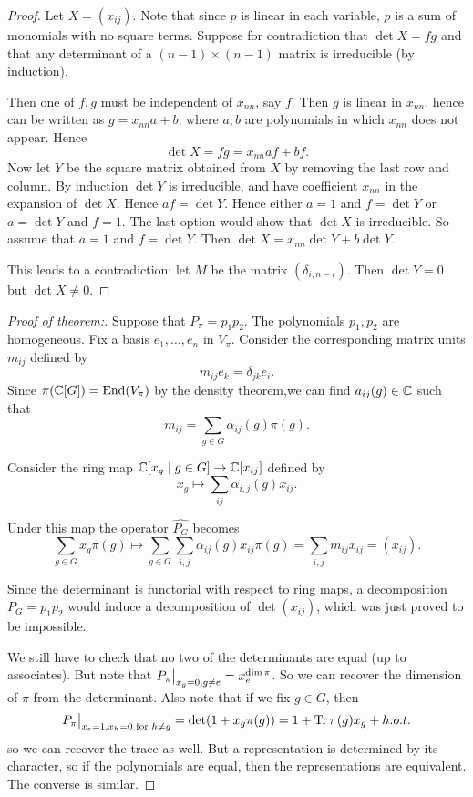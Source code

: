 \documentclass[11pt, english]{article}
\begin{document}
\begin{proof}
Let $X=(x_{ij})$. Note that since $p$ is linear in each variable, $p$ is a sum of monomials with no square terms. Suppose for contradiction that $\det X = fg$ and that any determinant of a $(n-1) \times (n-1)$ matrix is irreducible (by induction).

Then one of $f,g$ must be independent of $x_{nn}$, say $f$. Then $g$ is linear in $x_{nn}$, hence can be written as $g=x_{nn}a+b$, where $a,b$ are polynomials in which $x_{nn}$ does not appear. Hence
$$
\det X = fg = x_{nn}af+bf.
$$
Now let $Y$ be the square matrix obtained from $X$ by removing the last row and column. By induction $\det Y$ is irreducible, and have coefficient $x_{nn}$ in the expansion of $\det X$. Hence $af = \det Y$. Hence either $a=1$ and $f=\det Y$ or $a=\det Y$ and $f = 1$. The last option would show that $\det X$ is irreducible. So assume that $a=1$ and $f = \det Y$. Then $\det X = x_{nn} \det Y + b\det Y $.

This leads to a contradiction: let $M$ be the matrix $(\delta_{i,n-i})$. Then $\det Y=0$ but $\det X \neq 0$.
\end{proof}

\begin{proof}[Proof of theorem:]
  
Suppose that $P_\pi=p_1p_2$. The polynomials $p_1,p_2$ are homogeneous. Fix a basis $e_1,\ldots,e_n$ in $V_\pi$. Consider the corresponding matrix units $m_{ij}$ defined by
$$
m_{ij} e_k = \delta_{jk}e_i.
$$
Since $\pi(\mathbb{C}[G]) = \operatorname{End}(V_\pi)$ by the density theorem,we can find $a_{ij}(g) \in \mathbb{C}$ such that
$$
m_{ij} = \sum_{g \in G} \alpha_{ij}(g) \pi(g).
$$

Consider the ring map $\mathbb{C}[x_g \mid g \in G] \to \mathbb{C}[x_{ij}]$ defined by
$$
x_g \mapsto \sum_{ij} \alpha_{i,j}(g) x_{ij}.
$$

Under this map the operator $\widehat{P_G}$ becomes
$$
\sum_{g \in G} x_g \pi(g) \mapsto \sum_{g \in G} \sum_{i,j} \alpha_{ij}(g) x_{ij} \pi(g) = \sum_{i,j} m_{ij} x_{ij} = (x_{ij}).
$$

Since the determinant is functorial with respect to ring maps, a decomposition $P_G=p_1p_2$ would induce a decomposition of $\det (x_{ij})$, which was just proved to be impossible.

We still have to check that no two of the determinants are equal (up to associates). But note that $\restr{P_\pi}{x_g = 0, g \neq e}=x_e^{\dim \pi}$. So we can recover the dimension of $\pi$ from the determinant. Also note that if we fix $g \in G$, then
$$
\restr{P_\pi}{x_e=1, x_h =0 \text{ for } h \neq g} = \det(1+x_g\pi(g))=1+\tr \pi(g)x_g + h.o.t.
$$
so we can recover the trace as well. But a representation is determined by its character, so if the polynomials are equal, then the representations are equivalent. The converse is similar.
\end{proof}
\end{document}
